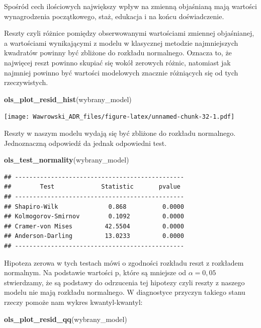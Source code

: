 \documentclass[
]{book}
\newenvironment{Shaded}{\begin{snugshade}}{\end{snugshade}}
\newcommand{\KeywordTok}[1]{\textcolor[rgb]{0.13,0.29,0.53}{\textbf{#1}}}
\newcommand{\NormalTok}[1]{#1}
\begin{document}
Spośród cech ilościowych największy wpływ na zmienną objaśnianą mają wartości wynagrodzenia początkowego, staż, edukacja i na końcu doświadczenie.

Reszty czyli różnice pomiędzy obserwowanymi wartościami zmiennej objaśnianej, a wartościami wynikającymi z modelu w klasycznej metodzie najmniejszych kwadratów powinny być zbliżone do rozkładu normalnego. Oznacza to, że najwięcej reszt powinno skupiać się wokół zerowych różnic, natomiast jak najmniej powinno być wartości modelowych znacznie różniących się od tych rzeczywistych.

\begin{Shaded}
\begin{Highlighting}[]
\KeywordTok{ols_plot_resid_hist}\NormalTok{(wybrany_model)}
\end{Highlighting}
\end{Shaded}

\texttt{[image: Wawrowski\_ADR\_files/figure-latex/unnamed-chunk-32-1.pdf]}

Reszty w naszym modelu wydają się być zbliżone do rozkładu normalnego. Jednoznaczną odpowiedź da jednak odpowiedni test.

\begin{Shaded}
\begin{Highlighting}[]
\KeywordTok{ols_test_normality}\NormalTok{(wybrany_model)}
\end{Highlighting}
\end{Shaded}

\begin{verbatim}
## -----------------------------------------------
##        Test             Statistic       pvalue  
## -----------------------------------------------
## Shapiro-Wilk              0.868          0.0000 
## Kolmogorov-Smirnov        0.1092         0.0000 
## Cramer-von Mises         42.5504         0.0000 
## Anderson-Darling         13.0233         0.0000 
## -----------------------------------------------
\end{verbatim}

Hipoteza zerowa w tych testach mówi o zgodności rozkładu reszt z rozkładem normalnym. Na podstawie wartości p, które są mniejsze od \(\alpha=0,05\) stwierdzamy, że są podstawy do odrzucenia tej hipotezy czyli reszty z naszego modelu nie mają rozkładu normalnego. W diagnostyce przyczyn takiego stanu rzeczy pomoże nam wykres kwantyl-kwantyl:

\begin{Shaded}
\begin{Highlighting}[]
\KeywordTok{ols_plot_resid_qq}\NormalTok{(wybrany_model)}
\end{Highlighting}
\end{Shaded}
\end{document}

